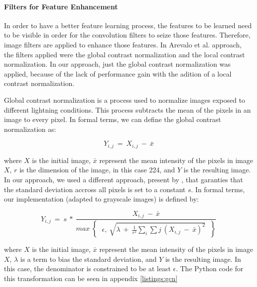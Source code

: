 \documentclass[
  twoside,
  11pt, a4paper,
  footinclude=true,
  headinclude=true,
  cleardoublepage=empty
]{scrbook}
\begin{document}
        \paragraph{Filters for Feature Enhancement}
          In order to have a better feature learning process, the features to be learned need to be visible in order for the convolution filters to seize those features. Therefore, image filters are applied to enhance those features. In Arevalo et al. \cite{arevalo2016representation} approach, the filters applied were the global contrast normalization and the local contrast normalization. In our approach, just the global contrast normalization was applied, because of the lack of performance gain with the adition of a local contrast normalization.

          Global contrast normalization is a process used to normalize images exposed to different lightning conditions. This process subtracts the mean of the pixels in an image to every pixel. In formal terms, we can define the global contrast normalization as:

          \begin{equation}
            Y_{i,j}\ =\ X_{i,j}\ -\ \bar{x}
          \end{equation}

          where $X$ is the initial image, $\bar{x}$ represent the mean intensity of the pixels in image $X$, $r$ is the dimension of the image, in this case 224, and $Y$ is the resulting image. In our approach, we used a different approach, present by \cite{}, that garanties that the standard deviation accross all pixels is set to a constant $s$. In formal terms, our implementation (adapted to grayscale images) is defined by:

          \begin{equation}
            Y_{i,j}\ =\ s\ *\ \frac{X_{i,j}\ -\ \bar{x}}{max\ \begin{Bmatrix}
                      \ \epsilon,\ \sqrt{\lambda\ +\ \frac{1}{r^2}\sum_{i}\sum{j}\ (X_{i,j}\ -\ \bar{x})^2}\
                      \end{Bmatrix}}
          \end{equation}

          where $X$ is the initial image, $\bar{x}$ represent the mean intensity of the pixels in image $X$, $\lambda$ is a term to bias the standard deviation, and $Y$ is the resulting image. In this case, the denominator is constrained to be at least $\epsilon$. The Python code for this transformation can be seen in appendix \ref{listings:gcn}
\end{document}
